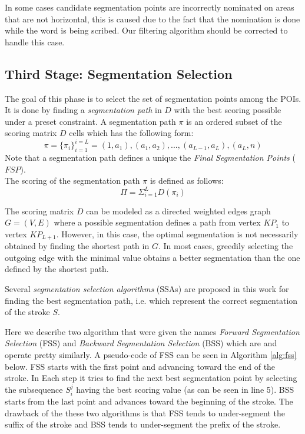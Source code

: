 \documentclass[journal,compsoc]{IEEEtran}
\begin{document}
In some cases candidate segmentation points are incorrectly nominated on areas that are not horizontal, this is caused due to the fact that the nomination is done while the word is being scribed. Our filtering algorithm should be corrected to handle this case.\\

\subsection{Third Stage: Segmentation Selection}
The goal of this phase is to select the set of segmentation points among the POIs. It is done by finding a \emph{segmentation path} in $D$ with the best scoring possible under a preset constraint. A segmentation path $\pi$ is an ordered subset of the scoring matrix $D$ cells which has the following form: 
\begin{equation}
\pi=\{\pi_i\}_{i=1}^{i=L}=(1,a_{1}),(a_{1},a_{2}),...,(a_{L-1},a_{L}),(a_{L},n)
\end{equation}
Note that a segmentation path defines a unique the \emph{Final Segmentation Points} ($FSP$).\\

The scoring of the segmentation path $\pi$ is defined as follows:
\begin{equation}
\Pi = \Sigma_{i=1}^{L}{D(\pi_{i})}
\end{equation}

The scoring matrix $D$ can be modeled as a directed weighted edges graph $G=(V,E)$ where a possible segmentation defines a path from vertex $KP_1$ to vertex $KP_{L+1}$. However, in this case, the optimal segmentation is not necessarily obtained by finding the shortest path in $G$. In most cases, greedily selecting the outgoing edge with the minimal value obtains a better segmentation than the one defined by the shortest path.


Several \emph{segmentation selection algorithms} (SSAs) are proposed in this work for finding the best segmentation path, i.e. which represent the correct segmentation of the stroke $S$.

Here we describe two algorithm that were given the names \emph{Forward Segmentation Selection} (FSS) and \emph{Backward Segmentation Selection} (BSS) which are and operate pretty similarly. A pseudo-code of FSS can be seen in Algorithm \ref{alg:fss} below. FSS starts with the first point and advancing toward the end of the stroke. In Each step it tries to find the next best segmentation point by selecting the subsequence $S_i^j$ having the best scoring value (as can be seen in line 5). BSS starts from the last point and advances toward the beginning of the stroke. The drawback of the these two algorithms is that FSS tends to under-segment the suffix of the stroke and BSS tends to under-segment the prefix of the stroke.   
\end{document}
